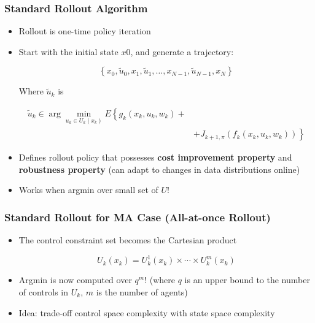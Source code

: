 \documentclass{beamer}
\begin{document}
    \begin{frame}
        \frametitle{Standard Rollout Algorithm}

        \begin{itemize}
            \item Rollout is one-time policy iteration
            \item Start with the initial
            state $x0$, and generate a trajectory:

            $$
            \left\{x_{0}, \tilde{u}_{0}, x_{1}, \tilde{u}_{1}, \ldots, x_{N-1}, \tilde{u}_{N-1}, x_{N}\right\}
            $$

            Where  $\tilde{u}_{k}$ is

            $$
            \begin{aligned}
                \tilde{u}_{k} \in \arg \min _{u_{k} \in U_{k}\left(x_{k}\right)} E\left\{g_{k}\left(x_{k}, u_{k}, w_{k}\right) + \right.\\
                &\left.+J_{k+1, \pi}\left(f_{k}\left(x_{k}, u_{k}, w_{k}\right)\right)\right\}
            \end{aligned}
            $$

            \item Defines rollout policy that
            possesses \textbf{cost improvement property}
            and \textbf{robustness property} (can adapt to
            changes in data distributions online)

            \item Works when argmin over small set of $U$!


        \end{itemize}


    \end{frame}




    \begin{frame}
        \frametitle{Standard Rollout for MA Case (All-at-once Rollout)}

        \begin{itemize}
            \item The control constraint set becomes
            the Cartesian product

            $$
            U_{k}\left(x_{k}\right)=U_{k}^{1}\left(x_{k}\right) \times \cdots \times U_{k}^{m}\left(x_{k}\right)
            $$

            \item Argmin is now computed over $q^m$! (where $q$ is an upper bound to the number of
            controls in $U_{k}$, $m$ is the number of agents)

            \item Idea: trade-off control space complexity
            with state space complexity

        \end{itemize}

    \end{frame}
\end{document}
